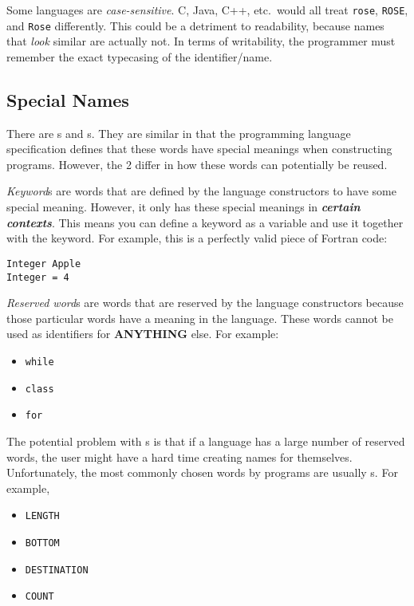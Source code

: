 Some languages are \emph{case-sensitive}.
C, Java, C++, etc.\ would all treat \texttt{rose}, \texttt{ROSE}, and \texttt{Rose} differently.
This could be a detriment to readability, because names that \textit{look} similar are actually not.
In terms of writability, the programmer must remember the exact typecasing of the identifier/name.

\subsection{Special Names}\label{subsec:Special_Names}
There are s and s.
They are similar in that the programming language specification defines that these words have special meanings when constructing programs.
However, the 2 differ in how these words can potentially be reused.

\begin{definition}[Keyword]\label{def:Keyword}
  \emph{Keyword}s are words that are defined by the language constructors to have some special meaning.
  However, it only has these special meanings in \textbf{\emph{certain contexts}}.
  This means you can define a keyword as a variable and use it together with the keyword.
  For example, this is a perfectly valid piece of Fortran code:
\begin{verbatim}
Integer Apple
Integer = 4
\end{verbatim}
\end{definition}

\begin{definition}\label{def:Reserved_Word}
  \emph{Reserved word}s are words that are reserved by the language constructors because those particular words have a meaning in the language.
  These words cannot be used as identifiers for \textbf{ANYTHING} else.
  For example:
  \begin{itemize}[noitemsep]
  \item \texttt{while}
  \item \texttt{class}
  \item \texttt{for}
  \end{itemize}

  \begin{remark}\label{rmk:Too_Many_Reserved_Words}
    The potential problem with s is that if a language has a large number of reserved words, the user might have a hard time creating names for themselves.
    Unfortunately, the most commonly chosen words by programs are usually s.
    For example,
    \begin{itemize}[noitemsep]
    \item \texttt{LENGTH}
    \item \texttt{BOTTOM}
    \item \texttt{DESTINATION}
    \item \texttt{COUNT}
    \end{itemize}
  \end{remark}
\end{definition}

